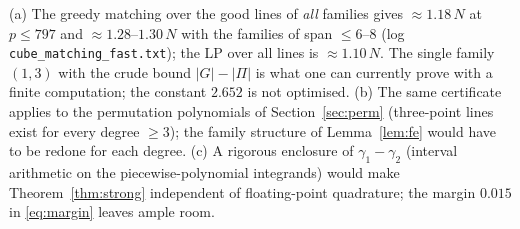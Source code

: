 \begin{remark}
(a) The greedy matching over the good lines of \emph{all} families gives $\approx1.18\,N$ at $p\le797$ and $\approx1.28$--$1.30\,N$ with the families of
span $\le6$--$8$ (log \texttt{cube\_matching\_fast.txt}); the LP over all lines is $\approx1.10\,N$.  The single family $(1,3)$ with the
crude bound $|G|-|\Pi|$ is what one can currently prove with a finite computation; the constant $2.652$ is not optimised.
(b) The same certificate applies to the permutation polynomials of Section~\ref{sec:perm} (three-point lines exist for every degree $\ge3$); the family
structure of Lemma~\ref{lem:fe} would have to be redone for each degree.
(c) A rigorous enclosure of $\gamma_1-\gamma_2$ (interval arithmetic on the piecewise-polynomial integrands) would make Theorem~\ref{thm:strong}
independent of floating-point quadrature; the margin $0.015$ in \eqref{eq:margin} leaves ample room.
\end{remark}
